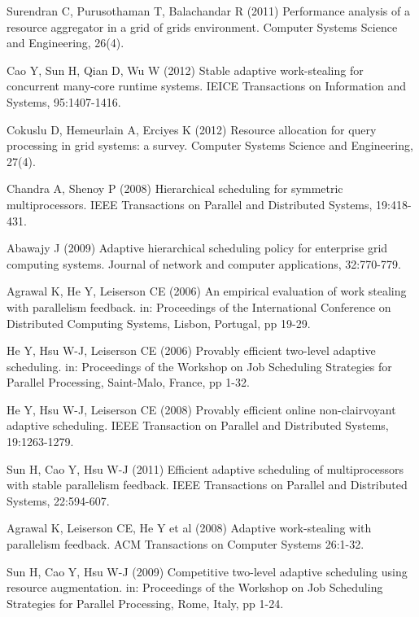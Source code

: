 \documentclass[10pt, a4paper]{article}
\begin{document}

\begin{thebibliography}{10}
Surendran C, Purusothaman T, Balachandar R (2011) Performance analysis of a resource aggregator in
a grid of grids environment. Computer Systems Science and Engineering, 26(4).

Cao Y, Sun H, Qian D, Wu W (2012) Stable adaptive work-stealing for concurrent many-core runtime
systems. IEICE Transactions on Information and Systems, 95:1407-1416.

Cokuslu D, Hemeurlain A, Erciyes K (2012) Resource allocation for query processing in grid systems:
a survey. Computer Systems Science and Engineering, 27(4).

Chandra A, Shenoy P (2008) Hierarchical scheduling for symmetric
  multiprocessors. IEEE Transactions on Parallel and Distributed
  Systems, 19:418-431.

Abawajy J (2009) Adaptive hierarchical scheduling policy for enterprise grid
  computing systems. Journal of network and computer applications, 32:770-779.

Agrawal K, He Y, Leiserson CE (2006) An empirical evaluation of work
  stealing with parallelism feedback. in: Proceedings of the
  International Conference on Distributed Computing Systems, Lisbon, Portugal,
  pp 19-29.

He Y, Hsu W-J, Leiserson CE (2006) Provably efficient two-level adaptive
  scheduling. in: Proceedings of the Workshop on Job Scheduling
  Strategies for Parallel Processing, Saint-Malo, France, pp 1-32.

He Y, Hsu W-J, Leiserson CE (2008) Provably efficient online
  non-clairvoyant adaptive scheduling. IEEE Transaction on Parallel and
  Distributed Systems, 19:1263-1279.

Sun H, Cao Y, Hsu W-J (2011) Efficient adaptive scheduling of
  multiprocessors with stable parallelism feedback. IEEE Transactions
  on Parallel and Distributed Systems, 22:594-607.

Agrawal K, Leiserson CE, He Y et al (2008) Adaptive work-stealing
  with parallelism feedback. ACM Transactions on Computer Systems
26:1-32.

Sun H, Cao Y, Hsu W-J (2009) Competitive two-level adaptive scheduling using resource
  augmentation. in: Proceedings of the Workshop on Job Scheduling Strategies for
  Parallel Processing, Rome, Italy, pp 1-24.


\end{thebibliography}
\end{document}
